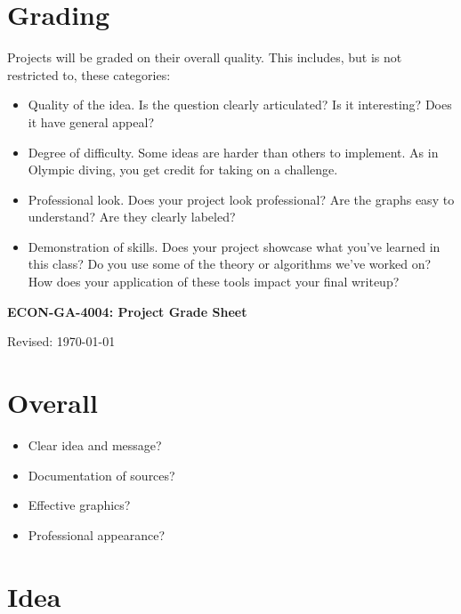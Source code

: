 \documentclass[11pt]{article}
\begin{document}
\section*{Grading}

Projects will be graded on their overall quality.  This includes, but is not
restricted to, these categories:
%
\begin{itemize}
\item Quality of the idea.  Is the question clearly articulated?  Is it
interesting? Does it have general appeal?
\item Degree of difficulty. Some ideas are harder than others to implement. As
in Olympic diving, you get credit for taking on a challenge.
\item Professional look.  Does your project look professional?  Are the graphs
easy to understand?  Are they clearly labeled?
\item Demonstration of skills. Does your project showcase what you've learned in
this class? Do you use some of the theory or algorithms we've worked on? How
does your application of these tools impact your final writeup?
\end{itemize}



\pagebreak
\thispagestyle{empty}

\bigskip\bigskip
\centerline{\Large \bf ECON-GA-4004:  Project Grade Sheet}
\centerline{Revised: \today}


\section*{Overall}

\begin{itemize} %
\item Clear idea and message?
\item Documentation of sources?
\item Effective graphics?
\item Professional appearance?
\end{itemize}
\bigskip

\section*{Idea}

\vspace*{0.75in}

\end{document}
